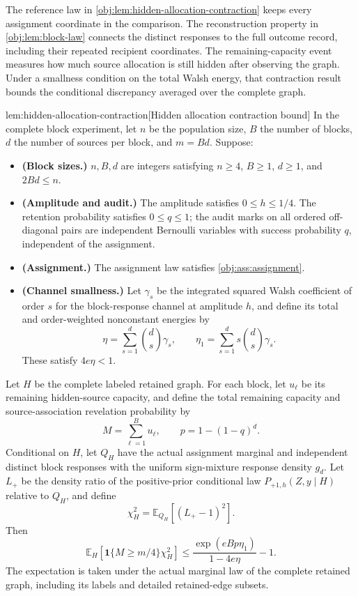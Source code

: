 The reference law in \cref{obj:lem:hidden-allocation-contraction} keeps every assignment coordinate in the comparison. The reconstruction property in \cref{obj:lem:block-law} connects the distinct responses to the full outcome record, including their repeated recipient coordinates. The remaining-capacity event measures how much source allocation is still hidden after observing the graph. Under a smallness condition on the total Walsh energy, that contraction result bounds the conditional discrepancy averaged over the complete graph.

\begin{lemmav}{lem:hidden-allocation-contraction}[Hidden allocation contraction bound]
In the complete block experiment, let \(n\) be the population size, \(B\) the number of blocks, \(d\) the number of sources per block, and \(m=Bd\). Suppose:
\begin{itemize}
\item \textbf{(Block sizes.)} \(n,B,d\) are integers satisfying \(n\ge4\), \(B\ge1\), \(d\ge1\), and \(2Bd\le n\).
\item \textbf{(Amplitude and audit.)} The amplitude satisfies \(0\le h\le1/4\). The retention probability satisfies \(0\le q\le1\); the audit marks on all ordered off-diagonal pairs are independent Bernoulli variables with success probability \(q\), independent of the assignment.
\item \textbf{(Assignment.)} The assignment law satisfies \cref{obj:ass:assignment}.
\item \textbf{(Channel smallness.)} Let \(\gamma_s\) be the integrated squared Walsh coefficient of order \(s\) for the block-response channel at amplitude \(h\), and define its total and order-weighted nonconstant energies by
\[
\eta=\sum_{s=1}^{d}\binom{d}{s}\gamma_s,
\qquad
\eta_1=\sum_{s=1}^{d}s\binom{d}{s}\gamma_s.
\]
These satisfy \(4e\eta<1\).
\end{itemize}
Let \(H\) be the complete labeled retained graph. For each block, let \(u_\ell\) be its remaining hidden-source capacity, and define the total remaining capacity and source-association revelation probability by
\[
M=\sum_{\ell=1}^{B}u_\ell,
\qquad
p=1-(1-q)^d.
\]
Conditional on \(H\), let \(Q_H\) have the actual assignment marginal and independent distinct block responses with the uniform sign-mixture response density \(g_d\). Let \(L_+\) be the density ratio of the positive-prior conditional law \(P_{+1,h}(Z,y\mid H)\) relative to \(Q_H\), and define
\[
\chi_H^2=\mathbb E_{Q_H}\!\left[(L_+-1)^2\right].
\]
Then
\[
\mathbb E_H\!\left[\mathbf1\{M\ge m/4\}\chi_H^2\right]
\le
\frac{\exp(eBp\eta_1)}{1-4e\eta}-1.
\]
The expectation is taken under the actual marginal law of the complete retained graph, including its labels and detailed retained-edge subsets.
\end{lemmav}

